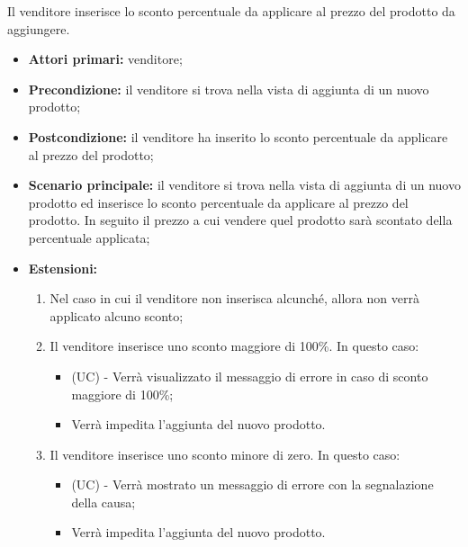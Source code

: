 Il venditore inserisce lo sconto percentuale da applicare al prezzo del prodotto da aggiungere.
\begin{itemize}
    \item \textbf{Attori primari:} venditore;
    \item \textbf{Precondizione:} il venditore si trova nella vista di aggiunta di un nuovo prodotto;
    \item \textbf{Postcondizione:} il venditore ha inserito lo sconto percentuale da applicare al prezzo del prodotto;
    \item \textbf{Scenario principale:} il venditore si trova nella vista di aggiunta di un nuovo prodotto ed inserisce lo sconto percentuale da applicare al prezzo del prodotto. In seguito il prezzo a cui vendere quel prodotto sarà scontato della percentuale applicata;
    \item \textbf{Estensioni:}
    \begin{enumerate}
    	\item Nel caso in cui il venditore non inserisca alcunché, allora non verrà applicato alcuno sconto;
    	\item Il venditore inserisce uno sconto maggiore di 100\%. In questo caso:
    	\begin{itemize}
    		\item (UC) - Verrà visualizzato il messaggio di errore in caso di sconto maggiore di 100\%;
    		\item Verrà impedita l'aggiunta del nuovo prodotto.
    	\end{itemize}
    	\item Il venditore inserisce uno sconto minore di zero. In questo caso:
    	\begin{itemize}
    		\item (UC) - Verrà mostrato un messaggio di errore con la segnalazione della causa;
    		\item Verrà impedita l'aggiunta del nuovo prodotto.
    	\end{itemize}
    \end{enumerate}
\end{itemize}

